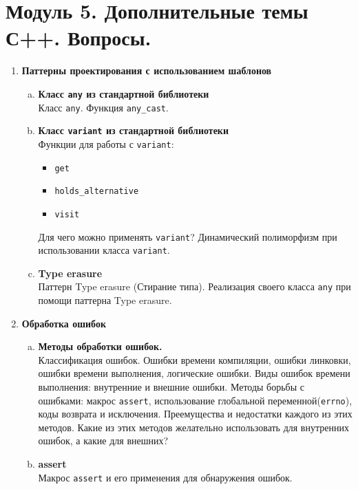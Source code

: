 \documentclass{article}
\begin{document}

\section*{Модуль 5. Дополнительные темы С++. Вопросы.}
\begin{enumerate}


\item \textbf{Паттерны проектирования с использованием шаблонов}
\begin{enumerate}[a.]
\item \textbf{Класс \texttt{any} из стандартной библиотеки}\\
Класс \texttt{any}. Функция \texttt{any\_cast}. 


\item \textbf{Класс \texttt{variant} из стандартной библиотеки}\\
Функции для работы с \texttt{variant}:
\begin{itemize}
\item \texttt{get}
\item \texttt{holds\_alternative}
\item \texttt{visit}
\end{itemize}
Для чего можно применять \texttt{variant}? Динамический полиморфизм при использовании класса \texttt{variant}.

\item \textbf{Type erasure}\\
Паттерн Type erasure (Стирание типа). Реализация своего класса \texttt{any} при помощи паттерна Type erasure.
\end{enumerate}

\item \textbf{Обработка ошибок}
\begin{enumerate}[a.]
\item \textbf{Методы обработки ошибок.}\\
Классификация ошибок. Ошибки времени компиляции, ошибки линковки, ошибки времени выполнения, логические ошибки.
Виды ошибок времени выполнения: внутренние и внешние ошибки. Методы борьбы с ошибками: макрос \texttt{assert}, использование глобальной переменной(\texttt{errno}), коды возврата и исключения. Преемущества и недостатки каждого из этих методов. Какие из этих методов желательно использовать для внутренних ошибок, а какие для внешних?


\item \textbf{assert}\\
Макрос \texttt{assert} и его применения для обнаружения ошибок.


\end{enumerate}
\end{enumerate}
\end{document}
